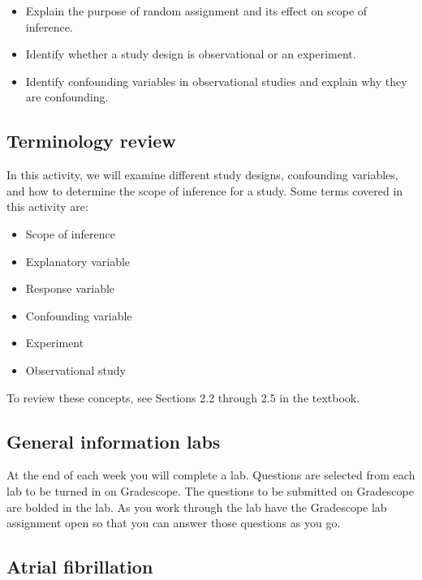 \documentclass[
]{report}
\begin{document}
\begin{itemize}
\item
  Explain the purpose of random assignment and its effect on scope of inference.
\item
  Identify whether a study design is observational or an experiment.
\item
  Identify confounding variables in observational studies and explain why they are confounding.
\end{itemize}

\hypertarget{terminology-review-3}{%
\subsection{Terminology review}\label{terminology-review-3}}

In this activity, we will examine different study designs, confounding variables, and how to determine the scope of inference for a study. Some terms covered in this activity are:

\begin{itemize}
\item
  Scope of inference
\item
  Explanatory variable
\item
  Response variable
\item
  Confounding variable
\item
  Experiment
\item
  Observational study
\end{itemize}

To review these concepts, see Sections 2.2 through 2.5 in the textbook.

\hypertarget{general-information-labs}{%
\subsection{General information labs}\label{general-information-labs}}

At the end of each week you will complete a lab. Questions are selected from each lab to be turned in on Gradescope. The questions to be submitted on Gradescope are bolded in the lab. As you work through the lab have the Gradescope lab assignment open so that you can answer those questions as you go.

\hypertarget{atrial-fibrillation}{%
\subsection{Atrial fibrillation}\label{atrial-fibrillation}}
\end{document}
